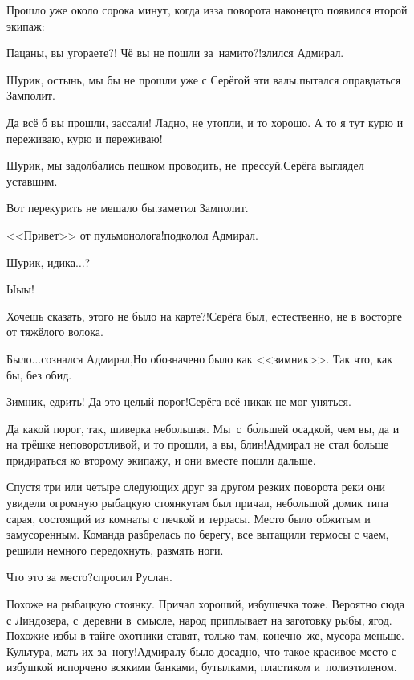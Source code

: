 Прошло уже около сорока минут, когда из\sdash за поворота наконец\sdash то появился второй экипаж:

\diagdash Пацаны, вы угораете?! Чё вы не пошли за~нами\sdash то?!\mdash злился Адмирал.

\diagdash Шурик, остынь, мы бы не прошли уже с Серёгой эти валы.\mdash пытался оправдаться Замполит.

\diagdash Да всё б вы прошли, зассали! Ладно, не утопли, и то хорошо. А то я тут курю и переживаю, курю и переживаю!

\diagdash Шурик, мы задолбались пешком проводить, не~прессуй.\mdash Серёга выглядел уставшим.

{
\diagdash Вот перекурить не мешало бы.\mdash заметил Замполит.

\diagdash <<Привет>> от пульмонолога!\mdash подколол Адмирал.
}

\diagdash Шурик, иди\sdash ка$\ldots$?

\diagdash Ы\sdash ы\sdash ы!

\diagdash Хочешь сказать, этого не было на карте?!\mdash Серёга был, естественно, не в восторге от тяжёлого волока.

\diagdash Было$\ldots$\mdash сознался Адмирал,\mdash Но обозначено было как <<зимник>>. Так что, как бы, без обид.

\diagdash Зимник, едрить! Да это целый порог!\mdash Серёга всё никак не мог уняться.

\diagdash Да какой порог, так, шиверка небольшая. Мы~с~б\'{о}льшей осадкой, чем вы, да и на трёшке неповоротливой, и то прошли, а вы, блин!\mdash Адмирал не стал больше придираться ко второму экипажу, и они вместе пошли дальше. 

Спустя три или четыре следующих друг за другом резких поворота реки они увидели огромную рыбацкую стоянку\mdash там был причал, небольшой домик типа сарая, состоящий из комнаты с печкой и террасы. Место было обжитым и замусоренным. Команда разбрелась по берегу, все вытащили термосы с чаем, решили немного передохнуть, размять ноги.

\diagdash Что это за место?\mdash спросил Руслан.

\diagdash Похоже на рыбацкую стоянку. Причал хороший, избушечка тоже. Вероятно сюда с Линдозера, с~деревни в~смысле, народ приплывает на заготовку рыбы, ягод. Похожие избы в тайге охотники ставят, только там, конечно~же, мусора меньше. Культура, мать их за~ногу!\mdash Адмиралу было досадно, что такое красивое место с избушкой испорчено всякими банками, бутылками, пластиком и~полиэтиленом.


